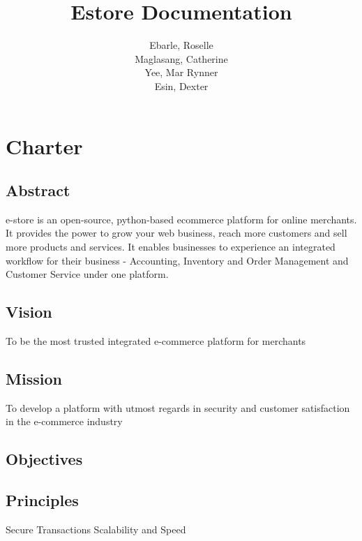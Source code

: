 \documentclass{report}
\begin{document}
\title{\textbf{Estore Documentation} \\ 
}
\author{
\normalsize
Ebarle, Roselle \\
Maglasang, Catherine \\
Yee, Mar Rynner \\
Esin, Dexter \\
}


\maketitle
\tableofcontents
\newpage
{}

\chapter{Charter}
\label{chpt: Charter}
\section{Abstract}
e-store is an open-source, python-based ecommerce platform for online merchants. It provides the power to grow your web business, reach more customers and sell more products and services. It enables businesses to experience an integrated workflow for their business - Accounting, Inventory and Order Management and Customer Service under one platform. 

\section{Vision}
To be the most trusted integrated e-commerce platform for merchants

\section{Mission}
To develop a platform with utmost regards in security and customer satisfaction in the e-commerce industry

\section{Objectives}

\section{Principles}
Secure Transactions
Scalability and Speed
\end{document}
